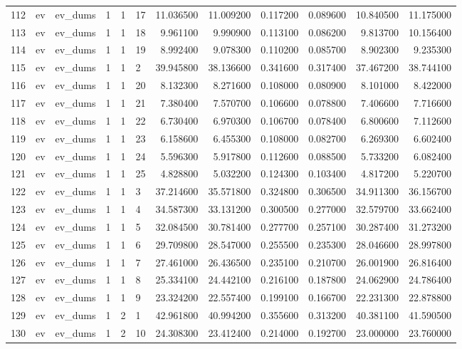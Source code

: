 \begin{tabular}{llllllrrrrrr}
112 & ev & ev_dums & 1 & 1 & 17 & 11.036500 & 11.009200 & 0.117200 & 0.089600 & 10.840500 & 11.175000 \\
113 & ev & ev_dums & 1 & 1 & 18 & 9.961100 & 9.990900 & 0.113100 & 0.086200 & 9.813700 & 10.156400 \\
114 & ev & ev_dums & 1 & 1 & 19 & 8.992400 & 9.078300 & 0.110200 & 0.085700 & 8.902300 & 9.235300 \\
115 & ev & ev_dums & 1 & 1 & 2 & 39.945800 & 38.136600 & 0.341600 & 0.317400 & 37.467200 & 38.744100 \\
116 & ev & ev_dums & 1 & 1 & 20 & 8.132300 & 8.271600 & 0.108000 & 0.080900 & 8.101000 & 8.422000 \\
117 & ev & ev_dums & 1 & 1 & 21 & 7.380400 & 7.570700 & 0.106600 & 0.078800 & 7.406600 & 7.716600 \\
118 & ev & ev_dums & 1 & 1 & 22 & 6.730400 & 6.970300 & 0.106700 & 0.078400 & 6.800600 & 7.112600 \\
119 & ev & ev_dums & 1 & 1 & 23 & 6.158600 & 6.455300 & 0.108000 & 0.082700 & 6.269300 & 6.602400 \\
120 & ev & ev_dums & 1 & 1 & 24 & 5.596300 & 5.917800 & 0.112600 & 0.088500 & 5.733200 & 6.082400 \\
121 & ev & ev_dums & 1 & 1 & 25 & 4.828800 & 5.032200 & 0.124300 & 0.103400 & 4.817200 & 5.220700 \\
122 & ev & ev_dums & 1 & 1 & 3 & 37.214600 & 35.571800 & 0.324800 & 0.306500 & 34.911300 & 36.156700 \\
123 & ev & ev_dums & 1 & 1 & 4 & 34.587300 & 33.131200 & 0.300500 & 0.277000 & 32.579700 & 33.662400 \\
124 & ev & ev_dums & 1 & 1 & 5 & 32.084500 & 30.781400 & 0.277700 & 0.257100 & 30.287400 & 31.273200 \\
125 & ev & ev_dums & 1 & 1 & 6 & 29.709800 & 28.547000 & 0.255500 & 0.235300 & 28.046600 & 28.997800 \\
126 & ev & ev_dums & 1 & 1 & 7 & 27.461000 & 26.436500 & 0.235100 & 0.210700 & 26.001900 & 26.816400 \\
127 & ev & ev_dums & 1 & 1 & 8 & 25.334100 & 24.442100 & 0.216100 & 0.187800 & 24.062900 & 24.786400 \\
128 & ev & ev_dums & 1 & 1 & 9 & 23.324200 & 22.557400 & 0.199100 & 0.166700 & 22.231300 & 22.878800 \\
129 & ev & ev_dums & 1 & 2 & 1 & 42.961800 & 40.994200 & 0.355600 & 0.313200 & 40.381100 & 41.590500 \\
130 & ev & ev_dums & 1 & 2 & 10 & 24.308300 & 23.412400 & 0.214000 & 0.192700 & 23.000000 & 23.760000 \\

\end{tabular}
